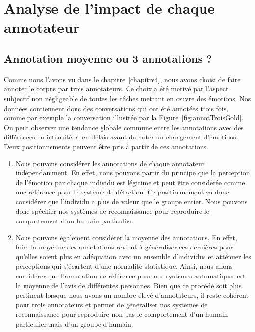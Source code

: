 \section{Analyse de l'impact de chaque annotateur}

\subsection{Annotation moyenne ou 3 annotations ?}
Comme nous l'avons vu dans le chapitre~\ref{chapitre4}, nous avons choisi de faire annoter le corpus par trois annotateurs. Ce choix a été motivé par l'aspect subjectif non négligeable de toutes les tâches mettant en œuvre des émotions. Nos données contiennent donc des conversations qui ont été annotées trois fois, comme par exemple la conversation illustrée par la Figure~\ref{fig:annotTroisGold}. On peut observer une tendance globale commune entre les annotations avec des différences en intensité et en délais avant de noter un changement d'émotions. Deux positionnements peuvent être pris à partir de ces annotations.



\begin{enumerate}
  \item Nous pouvons considérer les annotations de chaque annotateur indépendamment. En effet, nous pouvons partir du principe que la perception de l'émotion par chaque individu est légitime et peut être considérée comme une référence pour le système de détection.
  Ce positionnement va donc considérer que l'individu a plus de valeur que le groupe entier. Nous pouvons donc spécifier nos systèmes de reconnaissance pour reproduire le comportement d'un humain particulier.
  \item Nous pouvons également considérer la moyenne des annotations. En effet, faire la moyenne des annotations revient à généraliser ces dernières pour qu'elles soient plus en adéquation avec un ensemble d'individus et atténuer les perceptions qui s'écartent d'une normalité statistique. Ainsi, nous allons considérer que l'annotation de référence pour nos systèmes automatiques est la moyenne de l'avis de différentes personnes. Bien que ce procédé soit plus pertinent lorsque nous avons un nombre élevé d'annotateurs, il reste cohérent pour trois annotateurs et permet de généraliser nos systèmes de reconnaissance pour reproduire non pas le comportement d'un humain particulier mais d'un groupe d'humain.
\end{enumerate}


